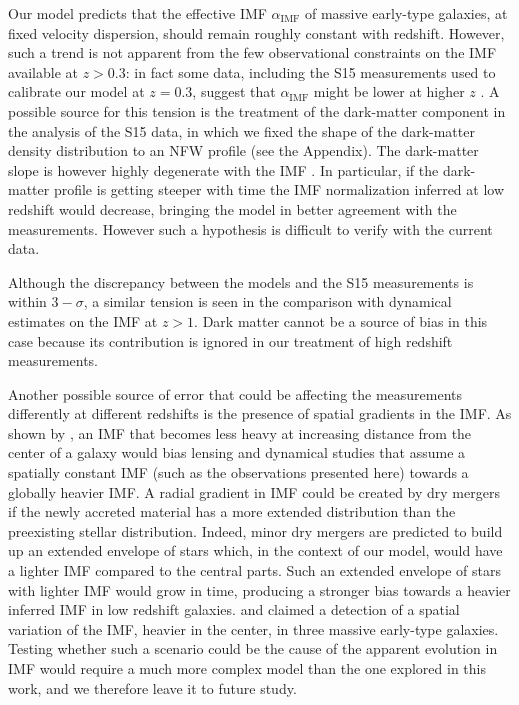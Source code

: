 \documentclass[usenatbib]{mnras}
\def\aimf{\alpha_{\mathrm{IMF}}}
\begin{document}
Our model predicts that the effective IMF $\aimf$ of massive
  early-type galaxies, at fixed velocity dispersion, should remain roughly constant with
  redshift. However, such a trend is not apparent
  from the few observational constraints on the IMF available at
  $z>0.3$: in fact some data, including the S15 measurements used to calibrate our model at $z=0.3$, suggest that $\aimf$ might be lower at higher
  $z$ \citep[see also][]{Tor++14}. 
 A possible
source for this tension is the treatment of the dark-matter component
in the analysis of the S15 data, in which we fixed the shape of
  the dark-matter density distribution to an NFW profile (see the
  Appendix). The dark-matter slope is however highly degenerate with
the IMF \citep[see e.g.][]{Aug++10}. In particular, if the
  dark-matter profile is getting steeper with time the IMF
  normalization inferred at low redshift would decrease, bringing the
  model in better agreement with the measurements. However such a
  hypothesis is difficult to verify with the current data.  

  Although
  the discrepancy between the models and the S15 measurements is
  within $3-\sigma$, a similar tension is seen in the comparison with
  dynamical estimates on the IMF at $z>1$.  Dark matter cannot be a
  source of bias in this case because its contribution is ignored in
  our treatment of high redshift measurements.

Another possible source of error that could be affecting the
measurements differently at different redshifts is the presence of
spatial gradients in the IMF.  As shown by \citet{New++15}, an IMF
that becomes less heavy at increasing distance from the center of a
galaxy would bias lensing and dynamical studies that assume a
spatially constant IMF (such as the observations presented here)
towards a globally heavier IMF. A radial gradient in IMF could be
created by dry mergers if the newly accreted material has a more
extended distribution than the preexisting stellar
distribution. Indeed, minor dry mergers are predicted to build up an
extended envelope of stars \citep{NJO09,Hop++10} which, in the context
of our model, would have a lighter IMF compared to the central
parts. Such an extended envelope of stars with lighter IMF would grow
in time, producing a stronger bias towards a heavier inferred IMF in
low redshift galaxies. \citet{Mar++15} and \citet{LaB++16} claimed a
detection of a spatial variation of the IMF, heavier in the center, in
three massive early-type galaxies.  Testing whether such a scenario
could be the cause of the apparent evolution in IMF would require a
much more complex model than the one explored in this work, and we
therefore leave it to future study.
\end{document}
